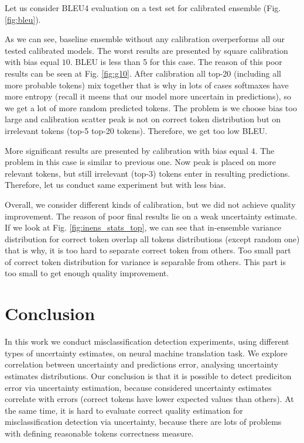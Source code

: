 \documentclass[a4paper,14pt]{extarticle}
\begin{document}
	Let us consider BLEU4 evaluation on a test set for calibrated ensemble (Fig. \ref{fig:bleu}).
	
	As we can see, baseline ensemble without any calibration overperforms all our tested calibrated models. The worst results are presented by square calibration with bias equal $10$. BLEU is less than 5 for this case. The reason of this poor results can be seen at Fig. \ref{fig:g10}. After calibration all top-20 (including all more probable tokens) mix together that is why in lots of cases softmaxes have more entropy (recall it meens that our model more uncertain in predictions), so we get a lot of more random predicted tokens. The problem is we choose bias too large and calibration scatter peak is not on correct token distribution but on irrelevant tokens (top-5 top-20 tokens). Therefore, we get too low BLEU.
	
	More significant results are presented by calibration with bias equal $4$. The problem in this case is similar to previous one. Now peak is placed on more relevant tokens, but still irrelevant (top-3) tokens enter in resulting predictions. Therefore, let us conduct same experiment but with less bias.
	
	Overall, we consider different kinds of calibration, but we did not achieve quality improvement. The reason of poor final results lie on a weak uncertainty estimate. If we look at Fig. \ref{fig:inens_stats_top}, we can see that in-ensemble variance distribution for correct token overlap all tokens distributions (except random one) that is why, it is too hard to separate correct token from others. Too small part of correct token distribution for variance is separable from others. This part is too small to get enough quality improvement.
\section{Conclusion}
	In this work we conduct misclassification detection experiments, using different types of uncertainty estimates, on neural machine translation task. We explore correlation between uncertainty and predictions error, analysing uncertainty estimates distributions. Our conclusion is that it is possible to detect prediciton error via uncertainty estimation, because considered uncertainty estimates correlate with errors (correct tokens have lower expected values than others). At the same time, it is hard to evaluate correct quality estimation for misclassification detection via uncertainty, because there are lots of problems with defining reasonable tokens correctness measure.
	
\end{document}
